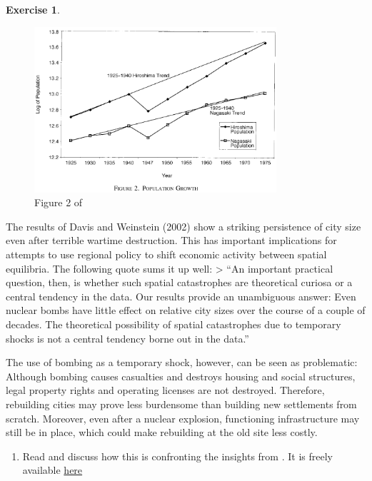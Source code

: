 \documentclass[
  12pt,
  oneside]{book}
\providecommand{\tightlist}{%
  \setlength{\itemsep}{0pt}\setlength{\parskip}{0pt}}
\theoremstyle{definition}
\theoremstyle{definition}
\theoremstyle{definition}
\newtheorem{exercise}{Exercise}[chapter]
\theoremstyle{definition}
\theoremstyle{remark}
\begin{document}
\begin{exercise}
\begin{figure}
\centering
\includegraphics[width=0.8\textwidth,height=\textheight]{fig/fig2weinstein.png}
\caption{\label{fig:fig2weinstein} Figure 2 of \citet{Davis2002Bones}}
\end{figure}

The results of Davis and Weinstein (2002) show a striking persistence of city size even after terrible wartime destruction. This has important implications for attempts to use regional policy to shift economic activity between spatial equilibria. The following quote sums it up well:
\textgreater{} ``An important practical question, then, is whether such spatial catastrophes are theoretical curiosa or a central tendency in the data. Our results provide an unambiguous answer: Even nuclear bombs have little effect on relative city sizes over the course of a couple of decades. The theoretical possibility of spatial catastrophes due to temporary shocks is not a central tendency borne out in the data.'' \citet[p.~1284]{Davis2002Bones}

The use of bombing as a temporary shock, however, can be seen as problematic:
Although bombing causes casualties and destroys housing and social structures, legal property rights and operating licenses are not destroyed. Therefore, rebuilding cities may prove less burdensome than building new settlements from scratch. Moreover, even after a nuclear explosion, functioning infrastructure may still be in place, which could make rebuilding at the old site less costly.

\begin{enumerate}
\def\labelenumi{\alph{enumi})}
\setcounter{enumi}{1}
\tightlist
\item
  Read \citet{Bleakley2012Portage} and discuss how this is confronting the insights from \citet{Davis2002Bones}. It is freely available \href{https://personal.lse.ac.uk/sturmd/brixen/pdf/Bleakley-Lin-QJE-2012.pdf}{here}
\end{enumerate}

\end{exercise}
\end{document}

